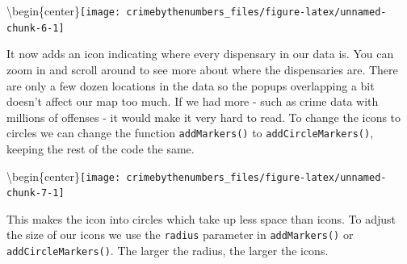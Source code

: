 \documentclass[
]{krantz}
\makeatletter
\newenvironment{Shaded}{\begin{snugshade}}{\end{snugshade}}
\newcommand{\AttributeTok}[1]{\textcolor[rgb]{0.61,0.61,0.61}{#1}}
\newcommand{\DecValTok}[1]{\textcolor[rgb]{0.06,0.06,0.06}{#1}}
\newcommand{\FunctionTok}[1]{\textcolor[rgb]{0,0,0}{#1}}
\newcommand{\NormalTok}[1]{#1}
\newcommand{\SpecialCharTok}[1]{\textcolor[rgb]{0,0,0}{#1}}
\newcommand{\StringTok}[1]{\textcolor[rgb]{0.5,0.5,0.5}{#1}}
\newenvironment{kframe}{%
\medskip{}
\setlength{\fboxsep}{.8em}
 \def\at@end@of@kframe{}%
 \ifinner\ifhmode%
  \def\at@end@of@kframe{\end{minipage}}%
  \begin{minipage}{\columnwidth}%
 \fi\fi%
 \def\FrameCommand##1{\hskip\@totalleftmargin \hskip-\fboxsep
 \colorbox{shadecolor}{##1}\hskip-\fboxsep
     \hskip-\linewidth \hskip-\@totalleftmargin \hskip\columnwidth}%
 \MakeFramed {\advance\hsize-\width
   \@totalleftmargin\z@ \linewidth\hsize
   \@setminipage}}%
 {\par\unskip\endMakeFramed%
 \at@end@of@kframe}
\renewenvironment{Shaded}{\begin{kframe}}{\end{kframe}}
\makeatother
\begin{document}
\textbackslash begin\{center\}\texttt{[image: crimebythenumbers\_files/figure-latex/unnamed-chunk-6-1]}

It now adds an icon indicating where every dispensary in our data is. You can zoom in and scroll around to see more about where the dispensaries are. There are only a few dozen locations in the data so the popups overlapping a bit doesn't affect our map too much. If we had more - such as crime data with millions of offenses - it would make it very hard to read. To change the icons to circles we can change the function \texttt{addMarkers()} to \texttt{addCircleMarkers()}, keeping the rest of the code the same.

\begin{Shaded}
\end{Shaded}

\textbackslash begin\{center\}\texttt{[image: crimebythenumbers\_files/figure-latex/unnamed-chunk-7-1]}

This makes the icon into circles which take up less space than icons. To adjust the size of our icons we use the \texttt{radius} parameter in \texttt{addMarkers()} or \texttt{addCircleMarkers()}. The larger the radius, the larger the icons.

\begin{Shaded}
\end{Shaded}
\end{document}
